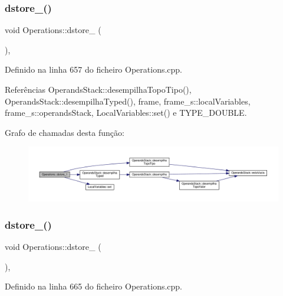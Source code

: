 \subsubsection{\texorpdfstring{dstore\+\_()}{dstore\_1()}}
{\footnotesize\ttfamily void Operations\+::dstore\+\_ (\begin{DoxyParamCaption}{ }\end{DoxyParamCaption})\hspace{0.3cm}{\ttfamily [static]}, {\ttfamily [private]}}



Definido na linha 657 do ficheiro Operations.\+cpp.



Referências Operands\+Stack\+::desempilha\+Topo\+Tipo(), Operands\+Stack\+::desempilha\+Typed(), frame, frame\+\_\+s\+::local\+Variables, frame\+\_\+s\+::operands\+Stack, Local\+Variables\+::set() e T\+Y\+P\+E\+\_\+\+D\+O\+U\+B\+LE.

Grafo de chamadas desta função\+:\nopagebreak
\begin{figure}[H]
\begin{center}
\leavevmode
\includegraphics[width=350pt]{classOperations_a5f12c99fca34f123522a6c1461782e5f_cgraph}
\end{center}
\end{figure}
\mbox{\label{classOperations_ad0f97963e6eb2482f5032fdb3465ec94}} 
\subsubsection{\texorpdfstring{dstore\+\_()}{dstore\_2()}}
{\footnotesize\ttfamily void Operations\+::dstore\+\_ (\begin{DoxyParamCaption}{ }\end{DoxyParamCaption})\hspace{0.3cm}{\ttfamily [static]}, {\ttfamily [private]}}



Definido na linha 665 do ficheiro Operations.\+cpp.




